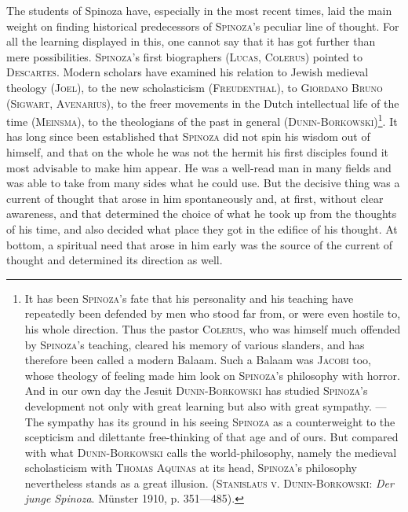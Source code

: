 \documentclass[12pt]{article}
\newcommand{\opage}[1]{\marginnote{\footnotesize\textit{[#1]}}}
\begin{document}
The students of Spinoza have, especially in the most recent times, laid the main
weight on finding historical predecessors of \textsc{Spinoza}'s peculiar line of
thought. For all the learning displayed in this, one cannot say that it has got
further than mere possibilities. \textsc{Spinoza}'s first biographers
(\textsc{Lucas}, \textsc{Colerus}) pointed to \textsc{Descartes}. Modern
scholars have examined his relation to Jewish medieval theology (\textsc{Joel}),
to the new scholasticism (\textsc{Freudenthal}), to \textsc{Giordano Bruno}
(\textsc{Sigwart}, \textsc{Avenarius}), to the freer movements in the Dutch
intellectual life of the time (\textsc{Meinsma}), to the theologians of the past
in general
(\textsc{Dunin-Borkowski})\footnote{It has been \textsc{Spinoza}'s fate that his
personality and his teaching have repeatedly been defended by men who stood far
from, or were even hostile to, his whole direction. Thus the pastor
\textsc{Colerus}, who was himself much offended by \textsc{Spinoza}'s teaching,
cleared his memory of various slanders, and has therefore been called a modern
Balaam. Such a Balaam was \textsc{Jacobi} too, whose theology of feeling made him
look on \textsc{Spinoza}'s philosophy with horror. And in our own day the Jesuit
\textsc{Dunin-Borkowski} has studied \textsc{Spinoza}'s development not only with
great learning but also with great sympathy. --- The sympathy has its ground in
his seeing \textsc{Spinoza} as a counterweight to the scepticism and dilettante
free-thinking of that age and of ours. But compared with what
\textsc{Dunin-Borkowski} calls the world-philosophy, namely the medieval
scholasticism with \textsc{Thomas Aquinas} at its head, \textsc{Spinoza}'s
philosophy nevertheless stands as a great illusion. (\textsc{Stanislaus v.
Dunin-Borkowski}: \textit{Der junge Spinoza}. Münster 1910, p. 351---485).}. It
has long since been established that \opage{5}\textsc{Spinoza} did not spin his
wisdom out of himself, and that on the whole he was not the hermit his first
disciples found it most advisable to make him appear. He was a well-read man in
many fields and was able to take from many sides what he could use. But the
decisive thing was a current of thought that arose in him spontaneously and, at
first, without clear awareness, and that determined the choice of what he took
up from the thoughts of his time, and also decided what place they got in the
edifice of his thought. At bottom, a spiritual need that arose in him early was
the source of the current of thought and determined its direction as well.
\end{document}
